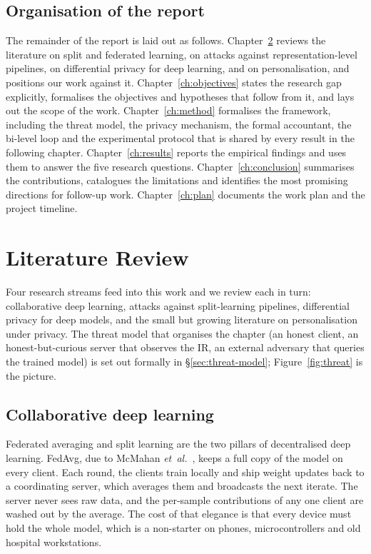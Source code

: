 \documentclass[11pt,a4paper,oneside]{report}
\begin{document}
\section{Organisation of the report}

The remainder of the report is laid out as follows.
Chapter~\ref{ch:related} reviews the literature on split and federated
learning, on attacks against representation-level pipelines, on
differential privacy for deep learning, and on personalisation, and
positions our work against it. Chapter~\ref{ch:objectives}
states the research gap explicitly, formalises the objectives and
hypotheses that follow from it, and lays out the scope of the work.
Chapter~\ref{ch:method} formalises the framework, including the
threat model, the privacy mechanism, the formal accountant, the
bi-level loop and the experimental protocol that is shared by every
result in the following chapter. Chapter~\ref{ch:results} reports the
empirical findings and uses them to answer the five research
questions. Chapter~\ref{ch:conclusion} summarises the contributions,
catalogues the limitations and identifies the most promising
directions for follow-up work. Chapter~\ref{ch:plan} documents the
work plan and the project timeline.

\chapter{Literature Review}
\label{ch:related}

Four research streams feed into this work and we review each in turn:
collaborative deep learning, attacks against split-learning pipelines,
differential privacy for deep models, and the small but growing
literature on personalisation under privacy. The threat model that
organises the chapter (an honest client, an honest-but-curious server
that observes the IR, an external adversary that queries the trained
model) is set out formally in \S\ref{sec:threat-model};
Figure~\ref{fig:threat} is the picture.

\section{Collaborative deep learning}

Federated averaging and split learning are the two pillars of
decentralised deep learning. FedAvg, due to McMahan
\textit{et~al.}~\cite{mcmahan2017fedavg}, keeps a full copy of the
model on every client. Each round, the clients train locally and ship
weight updates back to a coordinating server, which averages them and
broadcasts the next iterate. The server never sees raw data, and the
per-sample contributions of any one client are washed out by the
average. The cost of that elegance is that every device must hold the
whole model, which is a non-starter on phones, microcontrollers and
old hospital workstations.
\end{document}
